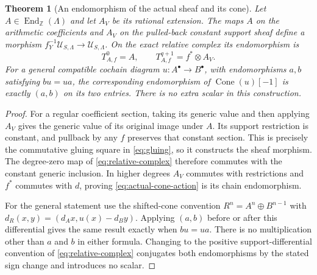 \documentclass[11pt,a4paper]{article}
\newtheorem{theorem}{Theorem}[section]
\theoremstyle{definition}\newtheorem{definition}[theorem]{Definition}
\newcommand{\Z}{\mathbb Z}\newcommand{\Q}{\mathbb Q}
\providecommand{\Cone}{\operatorname{Cone}}
\begin{document}
\begin{theorem}[An endomorphism of the actual sheaf and its cone]
\label{thm:cone-action}
Let $A\in\operatorname{End}_{\Z}(\Lambda)$ and let $A_V$ be its
rational extension. The maps $A$ on the arithmetic coefficients
and $A_V$ on the pulled-back constant support sheaf define a morphism
$f_Y^{-1}\mathcal U_{S,\Lambda}\to\mathcal U_{S,\Lambda}$.
On the exact relative complex its endomorphism is
\[
 T_{A,f}^0=A,\qquad
 T_{A,f}^{q+1}=f^*\otimes A_V.
 \tag{SE7}\label{eq:actual-cone-action}
\]
For a general compatible cochain diagram $u:A^\bullet\to B^\bullet$,
with endomorphisms $a,b$ satisfying $bu=ua$, the corresponding
endomorphism of $\Cone(u)[-1]$ is exactly $(a,b)$ on its two entries.
There is no extra scalar in this construction.
\end{theorem}
\begin{proof}
For a regular coefficient section, taking its generic value and then
applying $A_V$ gives the generic value of its original image under $A$.
Its support restriction is constant, and pullback by any $f$ preserves
that constant section. This is precisely the commutative gluing square
in \eqref{eq:gluing}, so it constructs the sheaf morphism.
The degree-zero map of \eqref{eq:relative-complex} therefore commutes
with the constant generic inclusion. In higher degrees
$A_V$ commutes with restrictions and $f^*$ commutes with $d$, proving
\eqref{eq:actual-cone-action} is its chain endomorphism.

For the general statement use the shifted-cone convention
$R^n=A^n\oplus B^{n-1}$ with
$d_R(x,y)=(d_Ax,u(x)-d_By)$. Applying $(a,b)$ before or after this
differential gives the same result exactly when $bu=ua$.
There is no multiplication other than $a$ and $b$ in either formula.
Changing to the positive support-differential convention of
\eqref{eq:relative-complex} conjugates both endomorphisms by the stated
sign change and introduces no scalar.
\end{proof}
\end{document}
